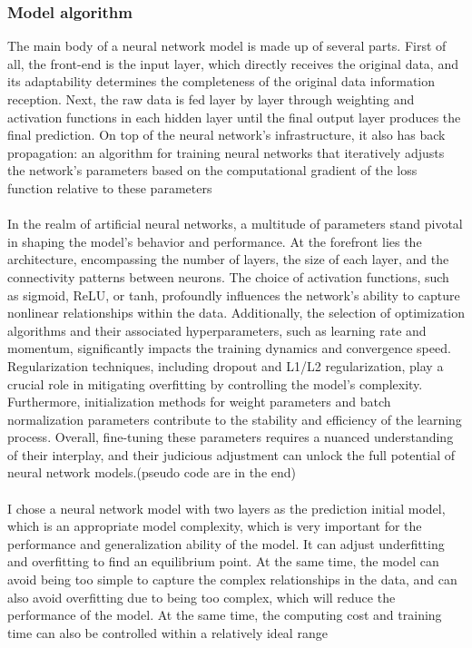 \documentclass[10pt]{article}
\begin{document}
\subsubsection{Model algorithm}
The main body of a neural network model is made up of several parts. First of all, the front-end is the input layer, which directly receives the original data, and its adaptability determines the completeness of the original data information reception. Next, the raw data is fed layer by layer through weighting and activation functions in each hidden layer until the final output layer produces the final prediction. On top of the neural network's infrastructure, it also has back propagation: an algorithm for training neural networks that iteratively adjusts the network's parameters based on the computational gradient of the loss function relative to these parameters
\\\\
In the realm of artificial neural networks, a multitude of parameters stand pivotal in shaping the model's behavior and performance. At the forefront lies the architecture, encompassing the number of layers, the size of each layer, and the connectivity patterns between neurons. The choice of activation functions, such as sigmoid, ReLU, or tanh, profoundly influences the network's ability to capture nonlinear relationships within the data. Additionally, the selection of optimization algorithms and their associated hyperparameters, such as learning rate and momentum, significantly impacts the training dynamics and convergence speed. Regularization techniques, including dropout and L1/L2 regularization, play a crucial role in mitigating overfitting by controlling the model's complexity. Furthermore, initialization methods for weight parameters and batch normalization parameters contribute to the stability and efficiency of the learning process. Overall, fine-tuning these parameters requires a nuanced understanding of their interplay, and their judicious adjustment can unlock the full potential of neural network models.(pseudo code are in the end)
\\\\
I chose a neural network model with two layers as the prediction initial model, which is an appropriate model complexity, which is very important for the performance and generalization ability of the model. It can adjust underfitting and overfitting to find an equilibrium point. At the same time, the model can avoid being too simple to capture the complex relationships in the data, and can also avoid overfitting due to being too complex, which will reduce the performance of the model. At the same time, the computing cost and training time can also be controlled within a relatively ideal range
\end{document}
